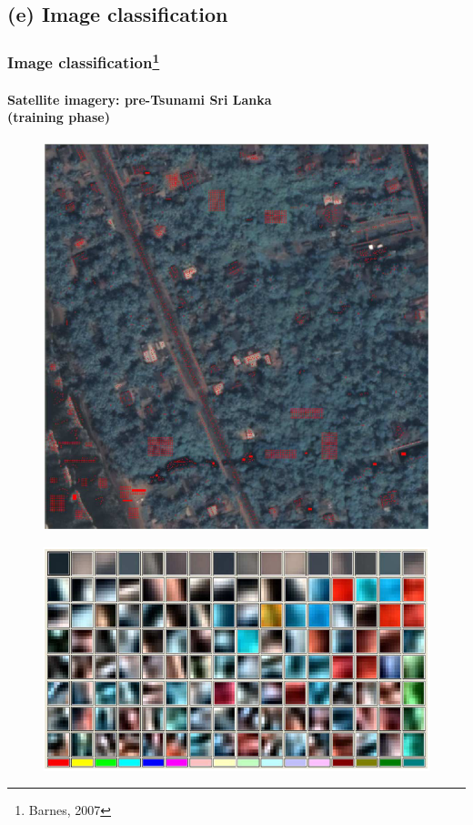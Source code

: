 \subsection{(e) Image classification}
\begin{frame}
\frametitle{Image classification\footnote{Barnes, 2007}}
\framesubtitle{\small Satellite imagery: pre-Tsunami Sri Lanka \\(training phase)}
\logoCSIPCPL\mypagenum
	\begin{figure}		
		\includegraphics[height=0.3\textheight]{thesis/RVQ_SatelliteSriLanka_1_snippets.png}			
	\end{figure}
	\begin{figure}		
		\includegraphics[height=0.35\textheight]{thesis/RVQ_SatelliteSriLanka_2_codebooks.png}			
	\end{figure}
\end{frame}




